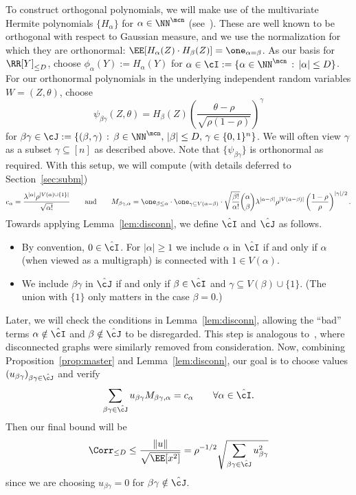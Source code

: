 \documentclass[11pt]{article}
\begin{document}
To construct orthogonal polynomials, we will make use of the multivariate Hermite polynomials $\{H_\alpha\}$ for $\alpha \in \NN^{\mcn}$ (see~\cite{sze-book}). These are well known to be orthogonal with respect to Gaussian measure, and we use the normalization for which they are orthonormal: $\EE[H_\alpha(Z) \cdot H_\beta(Z)] = \one_{\alpha=\beta}$. As our basis for $\RR[Y]_{\le D}$, choose $\phi_\alpha(Y) := H_\alpha(Y)$ for $\alpha \in \cI := \{\alpha \in \NN^{\mcn} \,:\, |\alpha| \le D\}$. For our orthonormal polynomials in the underlying independent random variables $W = (Z,\theta)$, choose
\[ \psi_{\beta\gamma}(Z,\theta) = H_\beta(Z) \left(\frac{\theta-\rho}{\sqrt{\rho(1-\rho)}}\right)^\gamma \]
for $\beta\gamma \in \cJ := \{(\beta,\gamma) \,:\, \beta \in \NN^{\mcn}, \, |\beta| \le D, \, \gamma \in \{0,1\}^n\}$. We will often view $\gamma$ as a subset $\gamma \subseteq [n]$ as described above. Note that $\{\psi_{\beta\gamma}\}$ is orthonormal as required. With this setup, we will compute (with details deferred to Section~\ref{sec:subm})
\[ c_\alpha = \frac{\lambda^{|\alpha|} \rho^{|V(\alpha) \cup \{1\}|}}{\sqrt{\alpha!}} \qquad \text{and} \qquad M_{\beta\gamma,\alpha} = \one_{\beta \le \alpha} \cdot \one_{\gamma \subseteq V(\alpha-\beta)} \cdot \sqrt{\frac{\beta!}{\alpha!}} \binom{\alpha}{\beta} \lambda^{|\alpha - \beta|} \rho^{|V(\alpha-\beta)|} \left(\frac{1-\rho}{\rho}\right)^{|\gamma|/2}. \]
Towards applying Lemma~\ref{lem:disconn}, we define $\hat\cI$ and $\hat\cJ$ as follows.
\begin{itemize}
    \item By convention, $0 \in \hat\cI$. For $|\alpha| \ge 1$ we include $\alpha$ in $\hat\cI$ if and only if $\alpha$ (when viewed as a multigraph) is connected with $1 \in V(\alpha)$.
    \item We include $\beta\gamma$ in $\hat\cJ$ if and only if $\beta \in \hat\cI$ and $\gamma \subseteq V(\beta) \cup \{1\}$. (The union with $\{1\}$ only matters in the case $\beta = 0$.)
\end{itemize}
\noindent Later, we will check the conditions in Lemma~\ref{lem:disconn}, allowing the ``bad'' terms $\alpha \notin \hat\cI$ and $\beta \notin \hat\cJ$ to be disregarded. This step is analogous to~\cite{SW-estimation}, where disconnected graphs were similarly removed from consideration. Now, combining Proposition~\ref{prop:master} and Lemma~\ref{lem:disconn}, our goal is to choose values $(u_{\beta\gamma})_{\beta\gamma \in \hat\cJ}$ and verify
\[ \sum_{\beta\gamma \in \hat\cJ} u_{\beta\gamma} M_{\beta\gamma,\alpha} = c_\alpha \qquad \forall \alpha \in \hat\cI. \]
Then our final bound will be
\[ \Corr_{\le D} \le \frac{\|u\|}{\sqrt{\EE[x^2]}} = \rho^{-1/2} \sqrt{\sum_{\beta\gamma \in \hat\cJ} u_{\beta\gamma}^2} \]
since we are choosing $u_{\beta\gamma} = 0$ for $\beta\gamma \notin \hat\cJ$.
\end{document}
